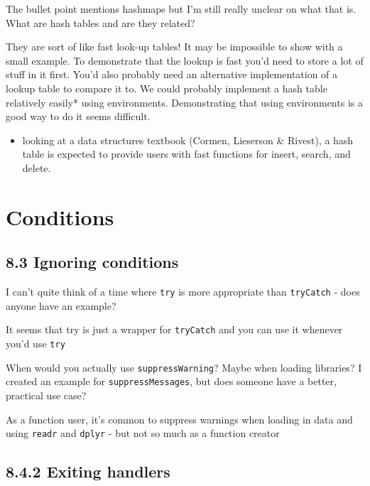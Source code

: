 \documentclass[]{book}
\providecommand{\tightlist}{%
  \setlength{\itemsep}{0pt}\setlength{\parskip}{0pt}}
\begin{document}
The bullet point mentions hashmaps but I'm still really unclear on what that is. What are hash tables and are they related?

They are sort of like fast look-up tables! It may be impossible to show with a small example. To demonstrate that the lookup is fast you'd need to store a lot of stuff in it first. You'd also probably need an alternative implementation of a lookup table to compare it to. We could probably implement a hash table relatively easily* using environments. Demonstrating that using environments is a good way to do it seems difficult.

\begin{itemize}
\tightlist
\item
  looking at a data structures textbook (Cormen, Lieserson \& Rivest), a hash table is expected to provide users with fast functions for insert, search, and delete.
\end{itemize}

\hypertarget{conditions}{%
\chapter{Conditions}\label{conditions}}

\hypertarget{ignoring-conditions}{%
\section*{8.3 Ignoring conditions}\label{ignoring-conditions}}

I can't quite think of a time where \texttt{try} is more appropriate than \texttt{tryCatch} - does anyone have an example?

It seems that try is just a wrapper for \texttt{tryCatch} and you can use it whenever you'd use \texttt{try}

When would you actually use \texttt{suppressWarning}? Maybe when loading libraries? I created an example for \texttt{suppressMessages}, but does someone have a better, practical use case?

As a function user, it's common to suppress warnings when loading in data and using \texttt{readr} and \texttt{dplyr} - but not so much as a function creator

\hypertarget{exiting-handlers}{%
\section*{8.4.2 Exiting handlers}\label{exiting-handlers}}
\end{document}
